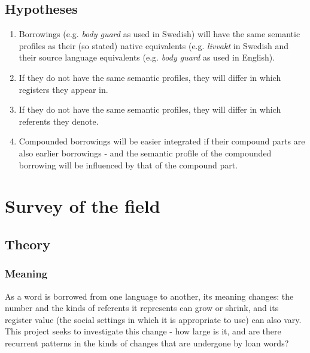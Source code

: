 \documentclass[a4paper]{article}
\begin{document}
\subsection{Hypotheses}
\begin{enumerate}
	\item Borrowings (e.g. \emph{body guard} as used in Swedish) will have the same semantic profiles as their (so stated) native equivalents (e.g. \emph{livvakt} in Swedish and their source language equivalents (e.g. \emph{body guard} as used in English).
	\item If they do not have the same semantic profiles, they will differ in which registers they appear in.
	\item If they do not have the same semantic profiles, they will differ in which referents they denote.
	\item Compounded borrowings will be easier integrated if their compound parts are also earlier borrowings - and the semantic profile of the compounded borrowing will be influenced by that of the compound part.
	
\end{enumerate}



\section{Survey of the field}


\subsection{Theory}


\subsubsection{Meaning}
\label{sect_meaning}

As a word is borrowed from one language to another, its meaning changes: the number and the kinds of referents it represents can grow or shrink, and its register value (the social settings in which it is appropriate to use) can also vary. This project seeks to investigate this change - how large is it, and are there recurrent patterns in the kinds of changes that are undergone by loan words?
\end{document}
